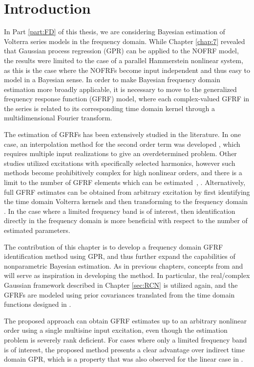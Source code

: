 \section{Introduction}

In Part \ref{part:FD} of this thesis, we are considering Bayesian estimation of Volterra series models in the frequency domain. While Chapter \ref{chap:7} revealed that Gaussian process regression (GPR) can be applied to the NOFRF model, the results were limited to the case of a parallel Hammerstein nonlinear system, as this is the case where the NOFRFs become input independent and thus easy to model in a Bayesian sense. In order to make Bayesian frequency domain estimation more broadly applicable, it is necessary to move to the generalized frequency response function (GFRF) model, where each complex-valued GFRF in the series is related to its corresponding time domain kernel through a multidimensional Fourier transform.

The estimation of GFRFs has been extensively studied in the literature. In one case, an interpolation method for the second order term was developed \cite{Nemeth2002}, which requires multiple input realizations to give an overdetermined problem. Other studies utilized excitations with specifically selected harmonics, however such methods become prohibitively complex for high nonlinear orders, and there is a limit to the number of GFRF elements which can be estimated~\cite{Boyd1983}, \cite{Evans1996}. Alternatively, full GFRF estimates can be obtained from arbitrary excitation by first identifying the time domain Volterra kernels and then transforming to the frequency domain \cite{Vlaar2018}. In the case where a limited frequency band is of interest, then identification directly in the frequency domain is more beneficial with respect to the number of estimated parameters.

The contribution of this chapter is to develop a frequency domain GFRF identification method using GPR, and thus further expand the capabilities of nonparametric Bayesian estimation. As in previous chapters, concepts from \cite{Birpoutsoukis2017} and \cite{Lataire2016} will serve as inspiration in developing the method. In particular, the real/complex Gaussian framework described in Chapter \ref{sec:RCN} is utilized again, and the GFRFs are modeled using prior covariances translated from the time domain functions designed in \cite{Birpoutsoukis2017}.

The proposed approach can obtain GFRF estimates up to an arbitrary nonlinear order using a single multisine input excitation, even though the estimation problem is severely rank deficient. For cases where only a limited frequency band is of interest, the proposed method presents a clear advantage over indirect time domain GPR, which is a property that was also observed for the linear case in \cite{Lataire2016}.

